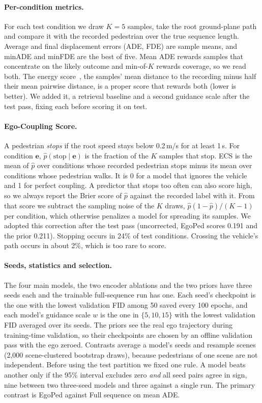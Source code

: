 \documentclass[letterpaper, 10 pt, conference]{ieeeconf}
\newcommand{\method}{EgoPed\xspace}
\newcommand{\fullseq}{Full sequence\xspace}
\begin{document}
\paragraph{Per-condition metrics.}
For each test condition we draw $K{=}5$ samples, take the root ground-plane path and compare it with the recorded pedestrian over the true sequence length. Average and final displacement errors (ADE, FDE) are sample means, and minADE and minFDE are the best of five. Mean ADE rewards samples that concentrate on the likely outcome and min-of-$K$ rewards coverage, so we read both. The energy score~\cite{gneiting2007strictly}, the samples' mean distance to the recording minus half their mean pairwise distance, is a proper score that rewards both (lower is better). We added it, a retrieval baseline and a second guidance scale after the test pass, fixing each before scoring it on test.

\paragraph{Ego-Coupling Score.}
\label{sec:behavior}
A pedestrian \emph{stops} if the root speed stays below 0.2\,m/s for at least 1\,s. For condition $\mathbf{e}$, $\hat{p}(\mathrm{stop}\mid\mathbf{e})$ is the fraction of the $K$ samples that stop. ECS is the mean of $\hat{p}$ over conditions whose recorded pedestrian stops minus its mean over conditions whose pedestrian walks. It is 0 for a model that ignores the vehicle and 1 for perfect coupling. A predictor that stops too often can also score high, so we always report the Brier score of $\hat{p}$ against the recorded label with it. From that score we subtract the sampling noise of the $K$ draws, $\hat{p}(1-\hat{p})/(K-1)$ per condition, which otherwise penalizes a model for spreading its samples. We adopted this correction after the test pass (uncorrected, \method scores 0.191 and the prior 0.211). Stopping occurs in 24\% of test conditions. Crossing the vehicle's path occurs in about 2\%, which is too rare to score.

\paragraph{Seeds, statistics and selection.}
The four main models, the two encoder ablations and the two priors have three seeds each and the trainable full-sequence run has one. Each seed's checkpoint is the one with the lowest validation FID among 50 saved every 100 epochs, and each model's guidance scale $w$ is the one in $\{5, 10, 15\}$ with the lowest validation FID averaged over its seeds. The priors see the real ego trajectory during training-time validation, so their checkpoints are chosen by an offline validation pass with the ego zeroed.
Contrasts average a model's seeds and resample scenes (2{,}000 scene-clustered bootstrap draws), because pedestrians of one scene are not independent. Before using the test partition we fixed one rule. A model beats another only if the 95\% interval excludes zero \emph{and} all seed pairs agree in sign, nine between two three-seed models and three against a single run. The primary contrast is \method against \fullseq on mean ADE.
\end{document}
